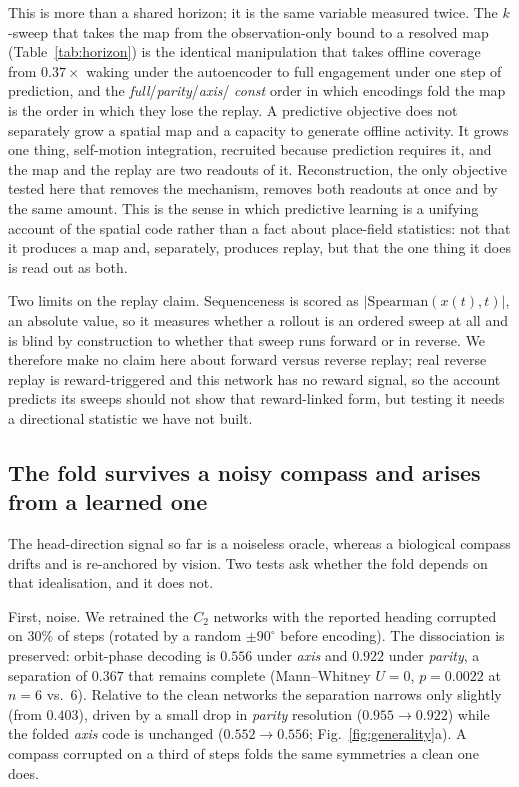 \documentclass[9pt,lineno]{elife}
\begin{document}
This is more than a shared horizon; it is the same variable measured twice. The $k$-sweep that takes
the map from the observation-only bound to a resolved map (Table~\ref{tab:horizon}) is the identical
manipulation that takes offline coverage from $0.37\times$ waking under the autoencoder to full
engagement under one step of prediction, and the \textit{full}/\textit{parity}/\textit{axis}/%
\textit{const} order in which encodings fold the map is the order in which they lose the replay. A
predictive objective does not separately grow a spatial map and a capacity to generate offline
activity. It grows one thing, self-motion integration, recruited because prediction requires it, and
the map and the replay are two readouts of it. Reconstruction, the only objective tested here that
removes the mechanism, removes both readouts at once and by the same amount. This is the sense in which
predictive learning is a unifying account of the spatial code rather than a fact about place-field
statistics: not that it produces a map and, separately, produces replay, but that the one thing it
does is read out as both.

Two limits on the replay claim. Sequenceness is scored as $|\mathrm{Spearman}(x(t), t)|$, an absolute
value, so it measures whether a rollout is an ordered sweep at all and is blind by construction to
whether that sweep runs forward or in reverse. We therefore make no claim here about forward versus
reverse replay; real reverse replay is reward-triggered \citep{fosterwilson2006, dibabuzsaki2007} and
this network has no reward signal, so the account predicts its sweeps should not show that
reward-linked form, but testing it needs a directional statistic we have not built.

\subsection{The fold survives a noisy compass and arises from a learned one}

The head-direction signal so far is a noiseless oracle, whereas a biological compass drifts and is
re-anchored by vision. Two tests ask whether the fold depends on that idealisation, and it does not.

First, noise. We retrained the $C_2$ networks with the reported heading corrupted on $30\%$ of steps
(rotated by a random $\pm 90^\circ$ before encoding). The dissociation is preserved: orbit-phase
decoding is $0.556$ under \textit{axis} and $0.922$ under \textit{parity}, a separation of $0.367$
that remains complete (Mann--Whitney $U = 0$, $p = 0.0022$ at $n = 6$ vs.\ $6$). Relative to the clean
networks the separation narrows only slightly (from $0.403$), driven by a small drop in \textit{parity}
resolution ($0.955 \to 0.922$) while the folded \textit{axis} code is unchanged ($0.552 \to 0.556$;
Fig.~\ref{fig:generality}a). A compass corrupted on a third of steps folds the same symmetries a clean
one does.
\end{document}
